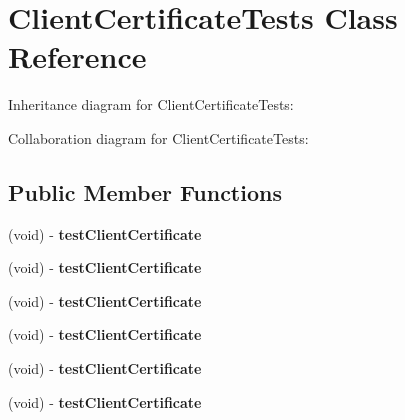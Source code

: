 \hypertarget{interface_client_certificate_tests}{
\section{\-Client\-Certificate\-Tests \-Class \-Reference}
\label{interface_client_certificate_tests}
}


\-Inheritance diagram for \-Client\-Certificate\-Tests\-:


\-Collaboration diagram for \-Client\-Certificate\-Tests\-:
\subsection*{\-Public \-Member \-Functions}
\begin{DoxyCompactItemize}
\item 
\hypertarget{interface_client_certificate_tests_ad49473b21c3259691ac61a6355abe89c}{
(void) -\/ {\bfseries test\-Client\-Certificate}}
\label{interface_client_certificate_tests_ad49473b21c3259691ac61a6355abe89c}

\item 
\hypertarget{interface_client_certificate_tests_ad49473b21c3259691ac61a6355abe89c}{
(void) -\/ {\bfseries test\-Client\-Certificate}}
\label{interface_client_certificate_tests_ad49473b21c3259691ac61a6355abe89c}

\item 
\hypertarget{interface_client_certificate_tests_ad49473b21c3259691ac61a6355abe89c}{
(void) -\/ {\bfseries test\-Client\-Certificate}}
\label{interface_client_certificate_tests_ad49473b21c3259691ac61a6355abe89c}

\item 
\hypertarget{interface_client_certificate_tests_ad49473b21c3259691ac61a6355abe89c}{
(void) -\/ {\bfseries test\-Client\-Certificate}}
\label{interface_client_certificate_tests_ad49473b21c3259691ac61a6355abe89c}

\item 
\hypertarget{interface_client_certificate_tests_ad49473b21c3259691ac61a6355abe89c}{
(void) -\/ {\bfseries test\-Client\-Certificate}}
\label{interface_client_certificate_tests_ad49473b21c3259691ac61a6355abe89c}

\item 
\hypertarget{interface_client_certificate_tests_ad49473b21c3259691ac61a6355abe89c}{
(void) -\/ {\bfseries test\-Client\-Certificate}}
\label{interface_client_certificate_tests_ad49473b21c3259691ac61a6355abe89c}


\end{DoxyCompactItemize}
